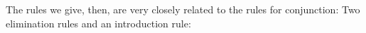 The rules we give, then, are very closely related to the rules for conjunction:
Two elimination rules
and an introduction rule:

%
%

